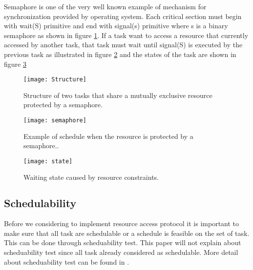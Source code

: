 Semaphore is one of the very well known example of mechanism for synchronization provided by operating system. Each critical section must begin with wait(S) primitive and end with signal(s) primitive where s is a binary semaphore as shown in figure \ref{fig:Structure}. If a task want to access a resource that currently accessed by another task, that task must wait until signal(S) is executed by the previous task as illustrated in figure \ref{fig:semaphore} and the states of the task are shown in figure \ref{fig:state}

\begin{figure}[h]
    \centering
    \texttt{[image: Structure]}
    \caption{Structure of two tasks that share a mutually exclusive resource protected by
a semaphore. \cite{b5}}
    \label{fig:Structure}
\end{figure}

\begin{figure}[h]
    \centering
    \texttt{[image: semaphore]}
    \caption{Example of schedule when the resource is protected by a semaphore.. \cite{b5}}
    \label{fig:semaphore}
\end{figure}

\begin{figure}[h]
    \centering
    \texttt{[image: state]}
    \caption{Waiting state caused by resource constraints. \cite{b5}}
    \label{fig:state}
\end{figure}



\subsection{Schedulability}

Before we considering to implement resource access protocol it is important to make sure that all task are schedulable or a schedule is feasible on the set of task. This can be done through scheduability test. This paper will not explain about scheduability test since all task already considered as schedulable. More detail about scheduability test can be found in \cite{b5}.





